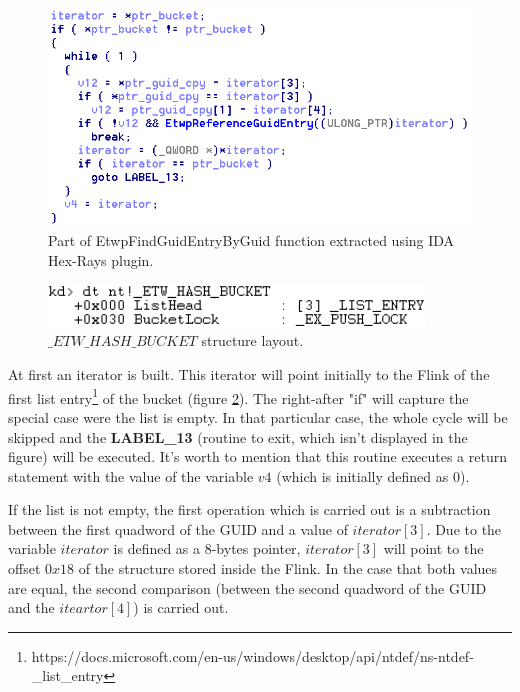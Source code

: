   \begin{centering}
  \begin{figure}[H]
    \includegraphics[width=12cm]{images/etwpfindguidentrybyguid_while.png}
    \caption[]{Part of EtwpFindGuidEntryByGuid function extracted using IDA Hex-Rays plugin.}
    \label{fig:EtwpFindGuidEntryByGuid_while}
  \end{figure}
  \end{centering}

  \begin{centering}
  \begin{figure}[H]
    \includegraphics[width=10cm]{images/_etw_hash_bucket_structure.png}
    \caption[]{$\_ETW\_HASH\_BUCKET$ structure layout.}
    \label{fig:etwhashbucketlayout}
  \end{figure}
  \end{centering}

  At first an iterator is built. This iterator will point initially to the Flink of the first list entry\footnote{https://docs.microsoft.com/en-us/windows/desktop/api/ntdef/ns-ntdef-\_list\_entry} of the bucket (figure \ref{fig:etwhashbucketlayout}). The right-after "if" will capture the special case were the list is empty. In that particular case, the whole cycle will be skipped and the {\bfseries LABEL\_13} (routine to exit, which isn't displayed in the figure) will be executed. It's worth to mention that this routine executes a return statement with the value of the variable $v4$ (which is initially defined as 0).

  If the list is not empty, the first operation which is carried out is a subtraction between the first quadword of the GUID and a value of $iterator[3]$. Due to the variable $iterator$ is defined as a 8-bytes pointer, $iterator[3]$ will point to the offset $0x18$ of the structure stored inside the Flink. In the case that both values are equal, the second comparison (between the second quadword of the GUID and the $iteartor[4]$) is carried out. 

